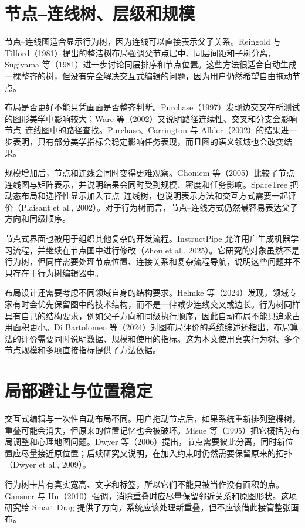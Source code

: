 \documentclass[11pt,a4paper,oneside,extrafontsizes]{memoir}
\begin{document}
\section{节点–连线树、层级和规模}

节点–连线图适合显示行为树，因为连线可以直接表示父子关系。Reingold 与 Tilford（1981）提出的整洁树布局强调父节点居中、同层间距和子树分离，Sugiyama 等（1981）进一步讨论同层排序和节点位置。这些方法很适合自动生成一棵整齐的树，但没有完全解决交互式编辑的问题，因为用户仍然希望自由拖动节点。

布局是否更好不能只凭画面是否整齐判断。Purchase（1997）发现边交叉在所测试的图形美学中影响较大；Ware 等（2002）又说明路径连续性、交叉和分支会影响节点–连线图中的路径查找。Purchase、Carrington 与 Allder（2002）的结果进一步表明，只有部分美学指标会稳定影响任务表现，而且图的语义领域也会改变结果。

规模增加后，节点和连线会同时变得更难观察。Ghoniem 等（2005）比较了节点–连线图与矩阵表示，并说明结果会同时受到规模、密度和任务影响。SpaceTree 把动态布局和选择性显示加入节点–连线树，也说明表示方法和交互方式需要一起评价（Plaisant et al., 2002）。对于行为树而言，节点–连线方式仍然最容易表达父子方向和同级顺序。

节点式界面也被用于组织其他复杂的开发流程。InstructPipe 允许用户生成机器学习流程，并继续在节点图中进行修改（Zhou et al., 2025）。它研究的对象虽然不是行为树，但同样需要处理节点位置、连接关系和复杂流程导航，说明这些问题并不只存在于行为树编辑器中。

布局设计还需要考虑不同领域自身的结构要求。Helmke 等（2024）发现，领域专家有时会优先保留图中的技术结构，而不是一律减少连线交叉或边长。行为树同样具有自己的结构要求，例如父子方向和同级执行顺序，因此自动布局不能只追求占用面积更小。Di Bartolomeo 等（2024）对图布局评价的系统综述还指出，布局算法的评价需要同时说明数据、规模和使用的指标。这为本文使用真实行为树、多个节点规模和多项直接指标提供了方法依据。

\section{局部避让与位置稳定}

交互式编辑与一次性自动布局不同。用户拖动节点后，如果系统重新排列整棵树，重叠可能会消失，但原来的位置记忆也会被破坏。Misue 等（1995）把它概括为布局调整和心理地图问题。Dwyer 等（2006）提出，节点需要彼此分离，同时新位置应尽量接近原位置；后续研究又说明，在加入约束时仍然需要保留原来的拓扑（Dwyer et al., 2009）。

行为树卡片有真实宽高、文字和标签，所以它们不能只被当作没有面积的点。Gansner 与 Hu（2010）强调，消除重叠时应尽量保留邻近关系和原图形状。这项研究给 Smart Drag 提供了方向，系统应该处理新重叠，但不应该借此接管整张画布。
\end{document}
